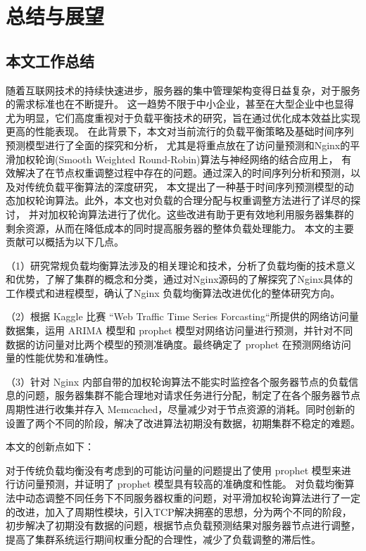 \chapter{总结与展望}

\section{本文工作总结}

随着互联网技术的持续快速进步，服务器的集中管理架构变得日益复杂，对于服务的需求标准也在不断提升。
这一趋势不限于中小企业，甚至在大型企业中也显得尤为明显，它们高度重视对于负载平衡技术的研究，旨在通过优化成本效益比实现更高的性能表现。
在此背景下，本文对当前流行的负载平衡策略及基础时间序列预测模型进行了全面的探究和分析，
尤其是将重点放在了访问量预测和Nginx的平滑加权轮询(Smooth Weighted Round-Robin)算法与神经网络的结合应用上，
有效解决了在节点权重调整过程中存在的问题。通过深入的时间序列分析和预测，以及对传统负载平衡算法的深度研究，
本文提出了一种基于时间序列预测模型的动态加权轮询算法。此外，本文也对负载的合理分配与权重调整方法进行了详尽的探讨，
并对加权轮询算法进行了优化。这些改进有助于更有效地利用服务器集群的剩余资源，从而在降低成本的同时提高服务器的整体负载处理能力。
本文的主要贡献可以概括为以下几点。

（1）研究常规负载均衡算法涉及的相关理论和技术，分析了负载均衡的技术意义和优势，了解了集群的概念和分类，通过对Nginx源码的了解探究了Nginx具体的工作模式和进程模型，确认了Nginx 负载均衡算法改进优化的整体研究方向。

（2）根据 Kaggle 比赛 “Web Traffic Time Series Forcasting“所提供的网络访问量数据集，运用 ARIMA 模型和 prophet 模型对网络访问量进行预测，并针对不同数据的访问量对比两个模型的预测准确度。最终确定了 prophet 在预测网络访问量的性能优势和准确性。

（3）针对 Nginx 内部自带的加权轮询算法不能实时监控各个服务器节点的负载信息的问题，服务器集群不能合理地对请求任务进行分配，制定了在各个服务器节点周期性进行收集并存入 Memcached，尽量减少对于节点资源的消耗。同时创新的设置了两个不同的阶段，解决了改进算法初期没有数据，初期集群不稳定的难题。

本文的创新点如下：

对于传统负载均衡没有考虑到的可能访问量的问题提出了使用 prophet 模型来进行访问量预测，并证明了 prophet 模型具有较高的准确度和性能。
对负载均衡算法中动态调整不同任务下不同服务器权重的问题，对平滑加权轮询算法进行了一定的改进，加入了周期性模块，引入TCP解决拥塞的思想，分为两个不同的阶段，
初步解决了初期没有数据的问题，根据节点负载预测结果对服务器节点进行调整，提高了集群系统运行期间权重分配的合理性，减少了负载调整的滞后性。

